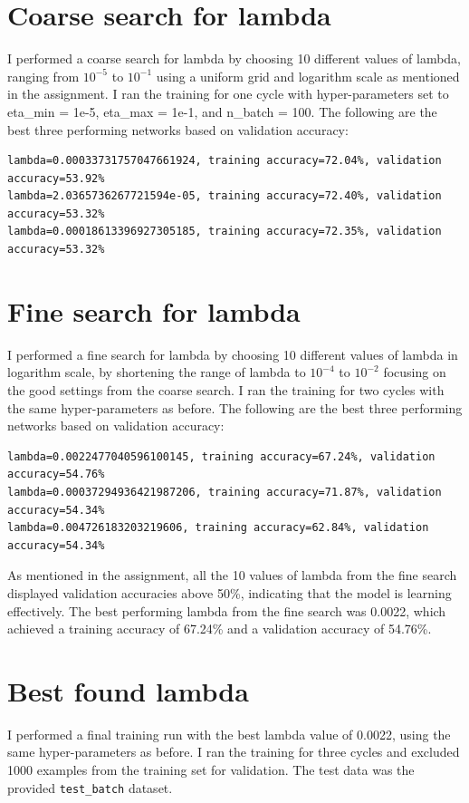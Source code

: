 \documentclass[11pt]{article}
\begin{document}
\section*{Coarse search for lambda}

I performed a coarse search for lambda by choosing 10 different values of lambda, ranging from $10^{-5}$ to $10^{-1}$ using a uniform grid and logarithm scale as mentioned in the assignment.
I ran the training for one cycle with hyper-parameters set to eta\_min = 1e-5, eta\_max = 1e-1, and n\_batch = 100. 
The following are the best three performing networks based on validation accuracy:
\begin{lstlisting}[caption={Coarse search for lambda}, label={lst:coarse_search}]
lambda=0.00033731757047661924, training accuracy=72.04%, validation accuracy=53.92%
lambda=2.0365736267721594e-05, training accuracy=72.40%, validation accuracy=53.32%
lambda=0.00018613396927305185, training accuracy=72.35%, validation accuracy=53.32%
\end{lstlisting}

\section*{Fine search for lambda}

I performed a fine search for lambda by choosing 10 different values of lambda in logarithm scale, by shortening the range of lambda to $10^{-4}$ to $10^{-2}$ focusing on the good settings from the coarse search.
I ran the training for two cycles with the same hyper-parameters as before.
The following are the best three performing networks based on validation accuracy:
\begin{lstlisting}[caption={Fine search for lambda}, label={lst:fine_search}]
lambda=0.0022477040596100145, training accuracy=67.24%, validation accuracy=54.76%
lambda=0.00037294936421987206, training accuracy=71.87%, validation accuracy=54.34%
lambda=0.004726183203219606, training accuracy=62.84%, validation accuracy=54.34% 
\end{lstlisting}

As mentioned in the assignment, all the 10 values of lambda from the fine search displayed validation accuracies above 50\%, indicating that the model is learning effectively.
The best performing lambda from the fine search was 0.0022, which achieved a training accuracy of 67.24\% and a validation accuracy of 54.76\%.

\section*{Best found lambda}
I performed a final training run with the best lambda value of 0.0022, using the same hyper-parameters as before.
I ran the training for three cycles and excluded 1000 examples from the training set for validation.
The test data was the provided \texttt{test\_batch} dataset. 
\end{document}
